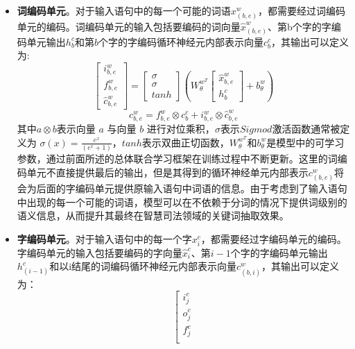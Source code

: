 \begin{itemize}
	\item \textbf{词编码单元}。对于输入语句中的每一个可能的词语$x_{(b,e)}^{w}$，都需要经过词编码单元的编码。词编码单元的输入包括要编码的词向量$\hat{x}_{(b,e)}^{w}$、第b个字的字编码单元输出$h_{b}^{c}$和第$b$个字的字编码循环神经元内部表示向量$c_{b}^{c}$，其输出可以定义为:
		\begin{equation}
			\left[
			\begin{array}{c}
				i_{b,e}^{w} \\
				f_{b,e}^{w} \\
				\hat{c}_{b,e}^{w}
			\end{array}
			\right] = 
			\left[
			\begin{array}{c}
				\sigma \\
				\sigma \\
				tanh
			\end{array}
			\right]
			\left(
			W_{\theta}^{w^{T}}
				\left[
				\begin{array}{c}
					\hat{x}_{b,e}^{w} \\
					h_{b}^{c}
				\end{array}
				\right] + b_{\theta}^{w}
			\right)
		\end{equation}
		\begin{equation}
			c_{b,e}^{w} = f_{b,e}^{w} \otimes c_{b}^{c} + i_{b,e}^{w} \otimes \hat{c}_{b,e}^{w}
		\end{equation}
		其中$a \otimes b$表示向量 $a$ 与向量 $b$ 进行对位乘积，$\sigma$表示$Sigmod$激活函数通常被定义为 $\sigma(x)=\frac{e^{x}}{(e^{x}+1)}$，$tanh$表示双曲正切函数，$W_{\theta}^{w^{T}}$和$b_{\theta}^{w}$是模型中的可学习参数，通过前面所述的总体联合学习框架在训练过程中不断更新。这里的词编码单元不直接提供最后的输出，但是其得到的循环神经单元内部表示$c_{(b,e)}^{w}$将会为后面的字编码单元提供原输入语句中词语的信息。由于考虑到了输入语句中出现的每一个可能的词语，模型可以在不依赖于分词的情况下提供词级别的语义信息，从而提升其最终在智慧司法领域的关键词抽取效果。
	\item \textbf{字编码单元}。对于输入语句中的每一个字$x_{i}^{c}$，都需要经过字编码单元的编码。字编码单元的输入包括要编码的字向量$\hat{x}_{i}^{c}$、第$i-1$个字的字编码单元输出$h_{(i-1)}^{c}$和以i结尾的词编码循环神经元内部表示向量$c_{(b,i)}^{w}$，其输出可以定义为：
		\begin{equation}
			\left[
			\begin{array}{c}
				i_{j}^{c} \\
				o_{j}^{c} \\
				f_{j}^{c} \\

\end{array}
\end{equation}
\end{itemize}
